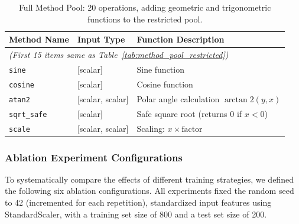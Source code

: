 \begin{table}[htbp]
\centering
\caption{Full Method Pool: 20 operations, adding geometric and trigonometric functions to the restricted pool.}
\label{tab:method_pool_full}
\begin{tabularx}{\linewidth}{@{}l l >{\raggedright\arraybackslash}X@{}}
\toprule
\textbf{Method Name} & \textbf{Input Type} & \textbf{Function Description} \\
\midrule
\multicolumn{3}{l}{\textit{(First 15 items same as Table~\ref{tab:method_pool_restricted})}} \\
\midrule
\texttt{sine} & [scalar] & Sine function \\
\texttt{cosine} & [scalar] & Cosine function \\
\texttt{atan2} & [scalar, scalar] & Polar angle calculation $\arctan2(y, x)$ \\
\texttt{sqrt\_safe} & [scalar] & Safe square root (returns 0 if $x < 0$) \\
\texttt{scale} & [scalar, scalar] & Scaling: $x \times \text{factor}$ \\
\bottomrule
\end{tabularx}
\end{table}

\subsubsection*{Ablation Experiment Configurations}

To systematically compare the effects of different training strategies, we defined the following six ablation configurations. All experiments fixed the random seed to 42 (incremented for each repetition), standardized input features using StandardScaler, with a training set size of 800 and a test set size of 200.

